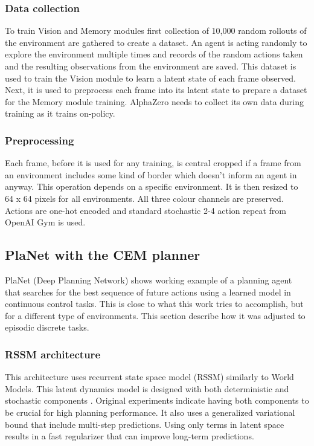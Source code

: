 \subsubsection{Data collection}

To train Vision and Memory modules first collection of 10,000 random rollouts of the environment are gathered to create a dataset. An agent is acting randomly to explore the environment multiple times and records of the random actions taken and the resulting observations from the environment are saved.
This dataset is used to train the Vision module to learn a latent state of each frame observed. Next, it is used to preprocess each frame into its latent state to prepare a dataset for the Memory module training.
AlphaZero needs to collect its own data during training as it trains on-policy.

\subsubsection{Preprocessing}

Each frame, before it is used for any training, is central cropped if a frame from an environment includes some kind of border which doesn't inform an agent in anyway. This operation depends on a specific environment. It is then resized to 64 x 64 pixels for all environments. All three colour channels are preserved. Actions are one-hot encoded and standard stochastic 2-4 action repeat from OpenAI Gym \cite{Code.OpenAIGym} is used.

\subsection{PlaNet with the CEM planner}

PlaNet (Deep Planning Network) shows working example of a planning agent that searches for the best sequence of future actions using a learned model in continuous control tasks. This is close to what this work tries to accomplish, but for a different type of environments. This section describe how it was adjusted to episodic discrete tasks.

\subsubsection{RSSM architecture}

This architecture uses recurrent state space model (RSSM) similarly to World Models. This latent dynamics model is designed with both deterministic and stochastic components \cite{Algo.FastGenerativeModels}. Original experiments indicate having both components to be crucial for high planning performance. It also uses a generalized variational bound that include multi-step predictions. Using only terms in latent space results in a fast regularizer that can improve long-term predictions.

